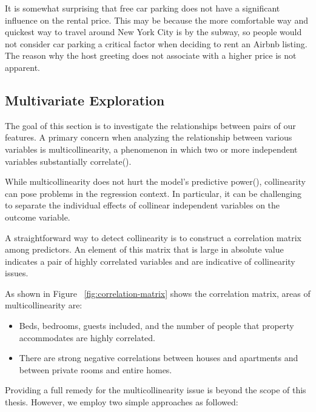 It is somewhat surprising that free car parking does not have a significant
influence on the rental price. This may be because the more comfortable way and
quickest way to travel around New York City is by the subway, so people would
not consider car parking a critical factor when deciding to rent an Airbnb
listing. The reason why the host greeting does not associate with a higher price
is not apparent.

\subsection{Multivariate Exploration}
\label{sec:multivariate-exploration}

The goal of this section is to investigate the relationships between pairs of
our features. A primary concern when analyzing the relationship between various
variables is multicollinearity, a phenomenon in which two or more independent
variables substantially correlate(\textcite{cohen2013applied}).

While multicollinearity does not hurt the model's predictive
power(\textcite{kutner2005applied}), collinearity can pose problems in the
regression context. In particular,  it can be challenging to separate the
individual effects of collinear independent variables on the outcome variable.

A straightforward way to detect collinearity is to construct a correlation
matrix among predictors.  An element of this matrix that is large in absolute
value indicates a pair of highly correlated variables and are indicative of
collinearity issues.


As shown in Figure ~\ref{fig:correlation-matrix} shows the correlation matrix,
areas of multicollinearity are:
\begin{itemize}
    \item Beds, bedrooms, guests included, and the number of people that
      property accommodates are highly correlated.
    \item There are strong negative correlations between houses and apartments
        and between private rooms and entire homes.
\end{itemize}

Providing a full remedy for the multicollinearity issue is beyond the scope of
this thesis. However, we employ two  simple approaches as followed:

